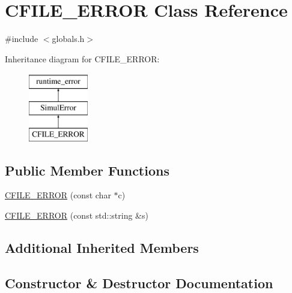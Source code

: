\hypertarget{classCFILE__ERROR}{}\section{C\+F\+I\+L\+E\+\_\+\+E\+R\+R\+OR Class Reference}
\label{classCFILE__ERROR}


{\ttfamily \#include $<$globals.\+h$>$}

Inheritance diagram for C\+F\+I\+L\+E\+\_\+\+E\+R\+R\+OR\+:\begin{figure}[H]
\begin{center}
\leavevmode
\includegraphics[height=3.000000cm]{classCFILE__ERROR}
\end{center}
\end{figure}
\subsection*{Public Member Functions}
\begin{DoxyCompactItemize}
\item 
\hyperlink{classCFILE__ERROR_abd14368fd5f3051baf336bbd24bab99f}{C\+F\+I\+L\+E\+\_\+\+E\+R\+R\+OR} (const char $\ast$c)
\item 
\hyperlink{classCFILE__ERROR_a20393787ce4998a586a518f0478de5f3}{C\+F\+I\+L\+E\+\_\+\+E\+R\+R\+OR} (const std\+::string \&s)
\end{DoxyCompactItemize}
\subsection*{Additional Inherited Members}


\subsection{Constructor \& Destructor Documentation}
\mbox{\label{classCFILE__ERROR_abd14368fd5f3051baf336bbd24bab99f}} 
